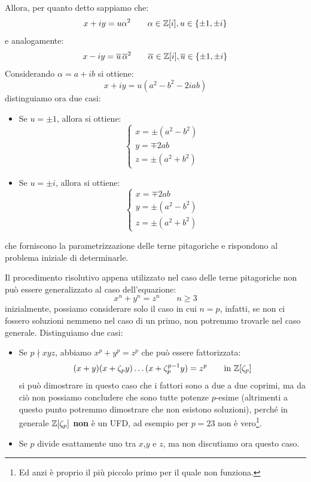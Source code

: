 \documentclass[11pt]{scrartcl}
\begin{document}
Allora, per quanto detto sappiamo che:
\[ x + iy = u\alpha^2 \qquad \alpha \in \mathbb Z[i], u \in \{\pm 1, \pm i\}
\]
e analogamente:
\[ x - iy = \overline u \,\overline\alpha^2 \qquad \overline\alpha \in \mathbb Z[i], \overline u \in \{\pm 1, \pm i\}
    \]
Considerando $\alpha = a+ib$ si ottiene:
\[ x + iy = u(a^2-b^2-2iab)
    \]
distinguiamo ora due casi:
\begin{itemize}
    \item Se $u = \pm 1$, allora si ottiene:
    \[ \begin{cases}
        x = \pm(a^2-b^2) \\
        y = \mp 2ab \\
        z = \pm (a^2+b^2)
    \end{cases}
        \]
    \item Se $u = \pm i$, allora si ottiene:
    \[ \begin{cases}
        x = \mp 2ab \\
        y = \pm(a^2-b^2) \\
        z = \pm (a^2+b^2)
    \end{cases}
    \]
\end{itemize}
che forniscono la parametrizzazione delle terne pitagoriche e rispondono al problema iniziale di determinarle.

\newpage
\begin{remark}
    Il procedimento risolutivo appena utilizzato nel caso delle terne pitagoriche non può essere generalizzato al caso dell'equazione:
    \[ x^n + y^n = z^n \qquad n\geq 3
        \]
    inizialmente, possiamo considerare solo il caso in cui $n = p$, infatti, se non ci fossero soluzioni nemmeno nel caso di un primo, non potremmo
    trovarle nel caso generale. Distinguiamo due casi:
    \begin{itemize}
        \item Se $p \nmid xyz$, abbiamo $x^p+y^p = z^p$ che può essere fattorizzata:
            \[ (x+y)(x+\zeta_py) \ldots (x + \zeta_p^{p-1}y) = z^p \qquad \text{in $\mathbb Z[\zeta_p]$}
                \]
            si può dimostrare in questo caso che i fattori sono a due a due coprimi,
            ma da ciò non possiamo concludere che sono tutte potenze $p$-esime (altrimenti a questo punto potremmo dimostrare che non esistono soluzioni),
            perché in generale $\mathbb Z[\zeta_p]$ \textbf{non} è un UFD, ad esempio per $p = 23$ non è vero\footnote{Ed anzi è proprio il più piccolo primo per il quale non funziona.}.
        \item Se $p$ divide esattamente uno tra $x$,$y$ e $z$, ma non discutiamo ora questo caso.
    \end{itemize}
\end{remark}
\end{document}
